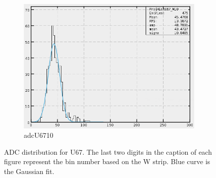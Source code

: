 \begin{figure}[h]
\begin{subfigure}[h]{0.3\textwidth}
        \includegraphics[width=\textwidth, keepaspectratio = true]{adcU67_10}
        \caption{adcU6710}
        \label{fig:adcU67_10}
    \end{subfigure}
    \caption{ADC distribution for U67. The last two digits in the caption of each figure represent the bin number based on the W strip.
    Blue curve is the Gaussian fit.}
    \label{fig:adcU1}
\end{figure}

